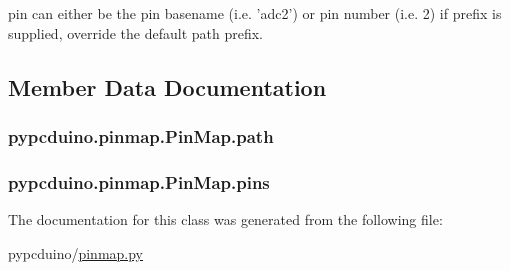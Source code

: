 pin can either be the pin basename (i.\-e. 'adc2') or pin number (i.\-e. 2) if prefix is supplied, override the default path prefix. 

\subsection{Member Data Documentation}
\hypertarget{classpypcduino_1_1pinmap_1_1_pin_map_a472b81fe48d6d7acbb1d4a637d870be9}{
\subsubsection[{path}]{\setlength{\rightskip}{0pt plus 5cm}pypcduino.\-pinmap.\-Pin\-Map.\-path}}\label{classpypcduino_1_1pinmap_1_1_pin_map_a472b81fe48d6d7acbb1d4a637d870be9}
\hypertarget{classpypcduino_1_1pinmap_1_1_pin_map_ade5e4f0ef3667e1b1cd2fd35af39029e}{
\subsubsection[{pins}]{\setlength{\rightskip}{0pt plus 5cm}pypcduino.\-pinmap.\-Pin\-Map.\-pins}}\label{classpypcduino_1_1pinmap_1_1_pin_map_ade5e4f0ef3667e1b1cd2fd35af39029e}


The documentation for this class was generated from the following file\-:\begin{DoxyCompactItemize}
\item 
pypcduino/\hyperlink{pinmap_8py}{pinmap.\-py}\end{DoxyCompactItemize}
